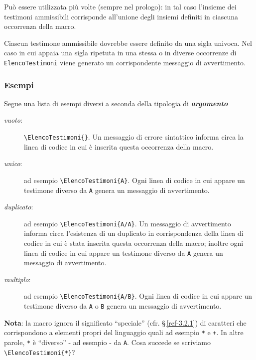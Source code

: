 \noindent Pu{\`o} essere utilizzata pi{\`u} volte (sempre nel prologo): in tal caso l'insieme dei testimoni ammissibili corrisponde all'unione degli insiemi definiti in ciascuna occorrenza della macro.

Ciascun testimone ammissibile dovrebbe essere definito da una sigla univoca. Nel caso in cui appaia una sigla ripetuta in una stessa o in diverse occorrenze di \verb"ElencoTestimoni" viene generato un corrispondente messaggio di avvertimento.

\subsubsection{Esempi}
Segue una lista di esempi diversi a seconda della tipologia di \textit{\textbf{argomento}}

\begin{description}
\item[\textit{vuoto}:] \verb"\ElencoTestimoni{}". Un messaggio di errore sintattico informa circa la linea di codice in cui {\`e} inserita questa occorrenza della macro.
\item[\textit{unico}:] ad esempio \verb"\ElencoTestimoni{A}". Ogni linea di codice in cui appare un testimone diverso da \verb"A" genera un messaggio di avvertimento.
\item[\textit{duplicato}:] ad esempio \verb"\ElencoTestimoni{A/A}". Un messaggio di avvertimento informa circa l'esistenza di un duplicato in corrispondenza della linea di codice in cui {\`e} stata inserita questa occorrenza della macro; inoltre ogni linea di codice in cui appare un testimone diverso da \verb"A" genera un messaggio di avvertimento.
\item[\textit{multiplo}:] ad esempio \verb"\ElencoTestimoni{A/B}". Ogni linea di codice in cui appare un testimone diverso da \verb"A" o \verb"B" genera un messaggio di avvertimento.
\end{description}

\noindent \textbf{Nota}: la macro ignora il significato ``speciale'' (cfr. \S\,\ref{ref-3.2.1}) di caratteri che corrispondono a elementi propri del linguaggio {\mtex} quali ad esempio \verb"*"\index{*} e \verb"+"\index{+}. In altre parole, \verb"*"\index{*} {\`e} ``diverso'' - ad esempio - da \verb"A". Cosa succede se scriviamo \verb"\ElencoTestimoni{*}"?

